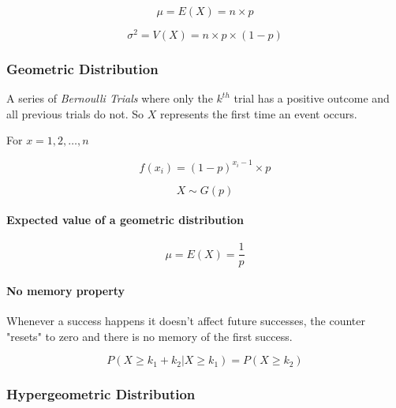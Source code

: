 \documentclass[a4paper, 10pt]{article}
\begin{document}
	\begin{equation*}
		\mu = E(X) = n\times p
	\end{equation*}

	\begin{equation*}
		\sigma^2 = V(X) = n\times p\times (1-p)
	\end{equation*}

	\subsubsection{Geometric Distribution}

	A series of \emph{Bernoulli Trials} where only the \(k^{th}\) trial has a positive outcome and all previous trials do not. So \(X\) represents the first time an event occurs.
	\newline

	\noindent For \(x=1,2,\ldots ,n\)

	\begin{equation*}
		f(x_i) = (1-p)^{x_i-1}\times p
	\end{equation*}

	\begin{equation*}
		X\sim G(p)
	\end{equation*}

	\paragraph{Expected value of a geometric distribution}

	\begin{equation*}
		\mu = E(X) = \frac{1}{p}
	\end{equation*}

	\paragraph{No memory property}

	Whenever a success happens it doesn't affect future successes, the counter "resets" to zero and there is no memory of the first success.

	\begin{equation*}
		P(X\geq k_1+k_2 | X\geq k_1) = P(X\geq k_2)
	\end{equation*}

	\subsubsection{Hypergeometric Distribution}
\end{document}
